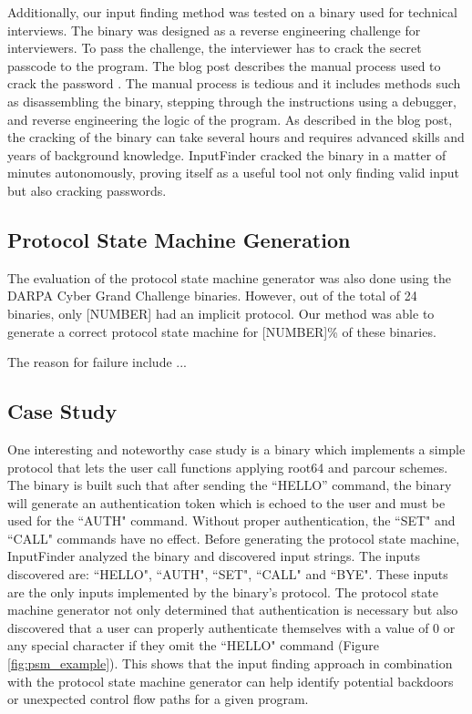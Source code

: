 \documentclass{acm_proc_article-sp}
\def \tool {InputFinder}
\def \numbinaries {24}
\begin{document}

Additionally, our input finding method was tested on a binary used for technical interviews.
The binary was designed as a reverse engineering challenge for interviewers.
To pass the challenge, the interviewer has to crack the secret passcode to the program.
The blog post describes the manual process used to crack the password \cite{interviewbinary}.
The manual process is tedious and it includes methods such as disassembling the binary, stepping through the instructions using a debugger, and reverse engineering the logic of the program.
As described in the blog post, the cracking of the binary can take several hours and requires advanced skills and years of background knowledge.
\tool{} cracked the binary in a matter of minutes autonomously, proving itself as a useful tool not only finding valid input but also cracking passwords.

\subsection{Protocol State Machine Generation}
The evaluation of the protocol state machine generator was also done using the DARPA Cyber Grand Challenge binaries.
However, out of the total of \numbinaries{} binaries, only [NUMBER] had an implicit protocol.
Our method was able to generate a correct protocol state machine for [NUMBER]\% of these binaries.

The reason for failure include ...

\subsection{Case Study}
One interesting and noteworthy case study is a binary which implements a simple protocol that lets the user call functions applying root64 and parcour schemes.
The binary is built such that after sending the ``HELLO'' command, the binary will generate an authentication token which is echoed to the user and must be used for the ``AUTH" command.
Without proper authentication, the ``SET" and ``CALL" commands have no effect.
Before generating the protocol state machine, \tool{} analyzed the binary and discovered input strings.
The inputs discovered are: ``HELLO", ``AUTH", ``SET", ``CALL" and ``BYE".
These inputs are the only inputs implemented by the binary's protocol.
The protocol state machine generator not only determined that authentication is necessary but also discovered that a user can properly authenticate themselves with a value of 0 or any special character if they omit the ``HELLO" command (Figure \ref{fig:psm_example}).
This shows that the input finding approach in combination with the protocol state machine generator can help identify potential backdoors or unexpected control flow paths for a given program.
\end{document}
